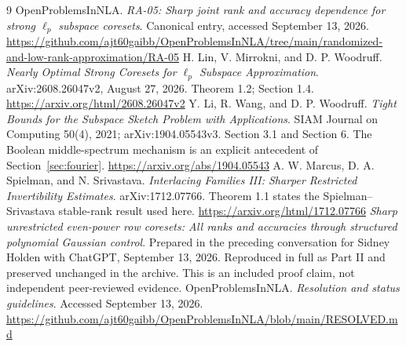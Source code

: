 \documentclass[11pt]{article}
\theoremstyle{remark}\newtheorem{remark}[theorem]{Remark}
\begin{document}
\begin{thebibliography}{9}
 OpenProblemsInNLA. \emph{RA-05: Sharp joint rank and accuracy dependence for strong $\ell_p$ subspace coresets}. Canonical entry, accessed September 13, 2026.\newline
\url{https://github.com/ajt60gaibb/OpenProblemsInNLA/tree/main/randomized-and-low-rank-approximation/RA-05}
 H. Lin, V. Mirrokni, and D. P. Woodruff. \emph{Nearly Optimal Strong Coresets for $\ell_p$ Subspace Approximation}. arXiv:2608.26047v2, August 27, 2026. Theorem 1.2; Section 1.4.\newline
\url{https://arxiv.org/html/2608.26047v2}
 Y. Li, R. Wang, and D. P. Woodruff. \emph{Tight Bounds for the Subspace Sketch Problem with Applications}. SIAM Journal on Computing 50(4), 2021; arXiv:1904.05543v3. Section 3.1 and Section 6. The Boolean middle-spectrum mechanism is an explicit antecedent of Section~\ref{sec:fourier}.\newline
\url{https://arxiv.org/abs/1904.05543}
 A. W. Marcus, D. A. Spielman, and N. Srivastava. \emph{Interlacing Families III: Sharper Restricted Invertibility Estimates}. arXiv:1712.07766. Theorem 1.1 states the Spielman--Srivastava stable-rank result used here.\newline
\url{https://arxiv.org/html/1712.07766}
 \emph{Sharp unrestricted even-power row coresets: All ranks and accuracies through structured polynomial Gaussian control}. Prepared in the preceding conversation for Sidney Holden with ChatGPT, September 13, 2026. Reproduced in full as Part II and preserved unchanged in the archive. This is an included proof claim, not independent peer-reviewed evidence.
 OpenProblemsInNLA. \emph{Resolution and status guidelines}. Accessed September 13, 2026.\newline
\url{https://github.com/ajt60gaibb/OpenProblemsInNLA/blob/main/RESOLVED.md}
\end{thebibliography}
\end{document}
